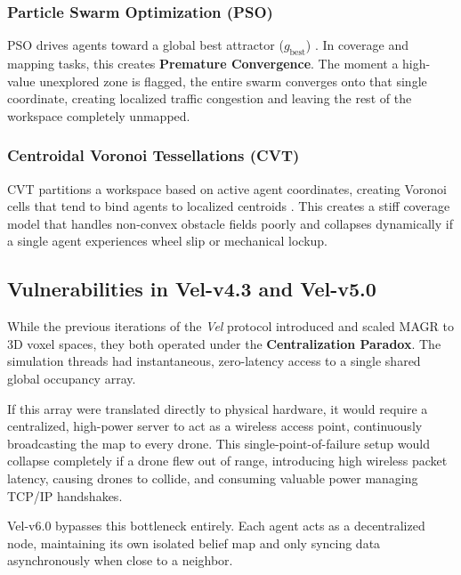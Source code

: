 \documentclass[letterpaper, 10pt, conference]{IEEEtran}
\begin{document}
\subsubsection{Particle Swarm Optimization (PSO)}
PSO drives agents toward a global best attractor ($g_{\text{best}}$) \cite{gad2022pso}. In coverage and mapping tasks, this creates \textbf{Premature Convergence}. The moment a high-value unexplored zone is flagged, the entire swarm converges onto that single coordinate, creating localized traffic congestion and leaving the rest of the workspace completely unmapped.

\subsubsection{Centroidal Voronoi Tessellations (CVT)}
CVT partitions a workspace based on active agent coordinates, creating Voronoi cells that tend to bind agents to localized centroids \cite{hu2020voronoi}. This creates a stiff coverage model that handles non-convex obstacle fields poorly and collapses dynamically if a single agent experiences wheel slip or mechanical lockup.

\subsection{Vulnerabilities in Vel-v4.3 and Vel-v5.0}
While the previous iterations of the \textit{Vel} protocol introduced and scaled MAGR to 3D voxel spaces, they both operated under the \textbf{Centralization Paradox}. The simulation threads had instantaneous, zero-latency access to a single shared global occupancy array. 

If this array were translated directly to physical hardware, it would require a centralized, high-power server to act as a wireless access point, continuously broadcasting the map to every drone. This single-point-of-failure setup would collapse completely if a drone flew out of range, introducing high wireless packet latency, causing drones to collide, and consuming valuable power managing TCP/IP handshakes.

Vel-v6.0 bypasses this bottleneck entirely. Each agent acts as a decentralized node, maintaining its own isolated belief map and only syncing data asynchronously when close to a neighbor.
\end{document}
